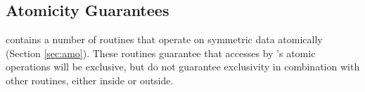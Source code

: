 

\subsection{Atomicity Guarantees}
\label{sec:amo_guarantees}
\openshmem contains a number of routines that operate on symmetric data
atomically (Section \ref{sec:amo}).  These routines guarantee that accesses by \openshmem's atomic operations will be exclusive, but do not guarantee exclusivity
in combination with other routines, either inside \openshmem or outside.

